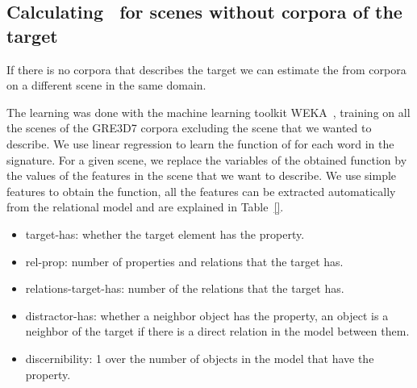 
\subsection{Calculating \puse\ for scenes without corpora of the target} \label{subsec:learning}

If there is no corpora that describes the target we can estimate the \puse from corpora on a different scene in the same domain. 


The learning was done with the machine learning toolkit WEKA~\cite{Hall:WEK09}, training on all the scenes of the GRE3D7 corpora excluding the scene that we wanted  to describe. We use linear regression to learn the function of \puse for each word in the signature. For a given scene, we replace the variables of the obtained function by the values of the features in the scene that we want to describe. We use simple features to obtain the function, all the features can be extracted automatically from the relational model and are explained in Table~\ref{}. 

\begin{small}
\begin{itemize}
\item target-has: whether the target element has the property.
\item rel-prop: number of properties and relations that the target has.
\item relations-target-has: number of the relations that the target has.
\item distractor-has: whether a neighbor object has the property, an object is a neighbor of the target if there is a direct relation in the model between them.
\item discernibility: 1 over the number of objects in the model that have the property.
\end{itemize}
\end{small}

